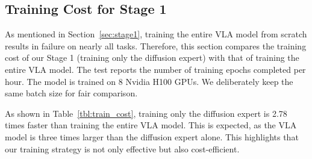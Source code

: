 \begin{appendix}
\subsection{Training Cost for Stage 1}
As mentioned in Section~\ref{sec:stage1}, training the entire VLA model from scratch results in failure on nearly all tasks.  Therefore, this section compares the training cost of our Stage 1 (training only the diffusion expert) with that of training the entire VLA model. The test reports the number of training epochs completed per hour. The model is trained on 8 Nvidia H100 GPUs. We deliberately keep the same batch size for fair comparison. 

As shown in Table~\ref{tbl:train_cost}, training only the diffusion expert is 2.78 times faster than training the entire VLA model. This is expected, as the VLA model is three times larger than the diffusion expert alone. This highlights that our training strategy is not only effective but also cost-efficient.

\begin{table}[t]
  \centering
  \caption{\textbf{Comparison of training cost for train only diffusion expert versus train entire VLA.} Training cost is measured by the number of training epochs completed per hour.}
  \label{tbl:train_cost}
\end{table}






\end{appendix}
